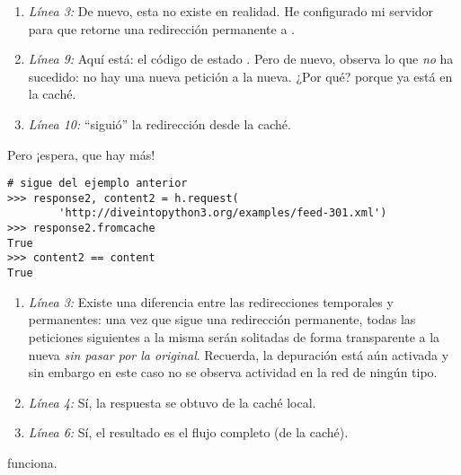 \begin{enumerate}

\item \emph{Línea 3:} De nuevo, esta  no existe en realidad. He configurado mi servidor para que retorne una redirección permanente a .

\item \emph{Línea 9:} Aquí está: el código de estado . Pero de nuevo, observa lo que \emph{no} ha sucedido: no hay una nueva petición a la  nueva. ¿Por qué? porque ya está en la caché.

\item \emph{Línea 10:}  ``siguió'' la redirección desde la caché.

\end{enumerate}

Pero ¡espera, que hay más!

\noindent\begin{minipage}{\textwidth}
\begin{lstlisting}[mathescape=True]
# sigue del ejemplo anterior
>>> response2, content2 = h.request(
        'http://diveintopython3.org/examples/feed-301.xml')
>>> response2.fromcache                        
True
>>> content2 == content                       
True
\end{lstlisting}
\end{minipage}

\begin{enumerate}

\item \emph{Línea 3:} Existe una diferencia entre las redirecciones temporales y permanentes: una vez que  sigue una redirección permanente, todas las peticiones siguientes a la misma  serán solitadas de forma transparente a la nueva  \emph{sin pasar por la  original}. Recuerda, la depuración está aún activada y sin embargo en este caso no se observa actividad en la red de ningún tipo.

\item \emph{Línea 4:} Sí, la respuesta se obtuvo de la caché local.

\item \emph{Línea 6:} Sí, el resultado es el flujo completo (de la caché).

\end{enumerate}


 funciona.


